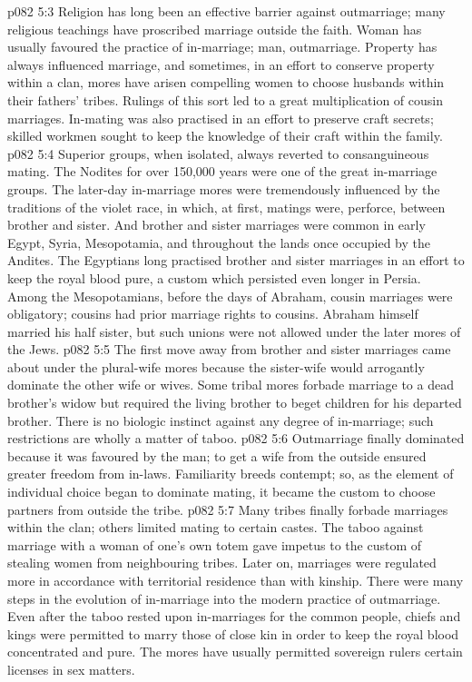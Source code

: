\vs p082 5:3 \pc Religion has long been an effective barrier against outmarriage; many religious teachings have proscribed marriage outside the faith. Woman has usually favoured the practice of in\hyp{}marriage; man, outmarriage. Property has always influenced marriage, and sometimes, in an effort to conserve property within a clan, mores have arisen compelling women to choose husbands within their fathers’ tribes. Rulings of this sort led to a great multiplication of cousin marriages. In\hyp{}mating was also practised in an effort to preserve craft secrets; skilled workmen sought to keep the knowledge of their craft within the family.
\vs p082 5:4 \pc Superior groups, when isolated, always reverted to consanguineous mating. The Nodites for over 150,000 years were one of the great in\hyp{}marriage groups. The later\hyp{}day in\hyp{}marriage mores were tremendously influenced by the traditions of the violet race, in which, at first, matings were, perforce, between brother and sister. And brother and sister marriages were common in early Egypt, Syria, Mesopotamia, and throughout the lands once occupied by the Andites. The Egyptians long practised brother and sister marriages in an effort to keep the royal blood pure, a custom which persisted even longer in Persia. Among the Mesopotamians, before the days of Abraham, cousin marriages were obligatory; cousins had prior marriage rights to cousins. Abraham himself married his half sister, but such unions were not allowed under the later mores of the Jews.
\vs p082 5:5 The first move away from brother and sister marriages came about under the plural\hyp{}wife mores because the sister\hyp{}wife would arrogantly dominate the other wife or wives. Some tribal mores forbade marriage to a dead brother’s widow but required the living brother to beget children for his departed brother. There is no biologic instinct against any degree of in\hyp{}marriage; such restrictions are wholly a matter of taboo.
\vs p082 5:6 \pc Outmarriage finally dominated because it was favoured by the man; to get a wife from the outside ensured greater freedom from in\hyp{}laws. Familiarity breeds contempt; so, as the element of individual choice began to dominate mating, it became the custom to choose partners from outside the tribe.
\vs p082 5:7 Many tribes finally forbade marriages within the clan; others limited mating to certain castes. The taboo against marriage with a woman of one’s own totem gave impetus to the custom of stealing women from neighbouring tribes. Later on, marriages were regulated more in accordance with territorial residence than with kinship. There were many steps in the evolution of in\hyp{}marriage into the modern practice of outmarriage. Even after the taboo rested upon in\hyp{}marriages for the common people, chiefs and kings were permitted to marry those of close kin in order to keep the royal blood concentrated and pure. The mores have usually permitted sovereign rulers certain licenses in sex matters.
